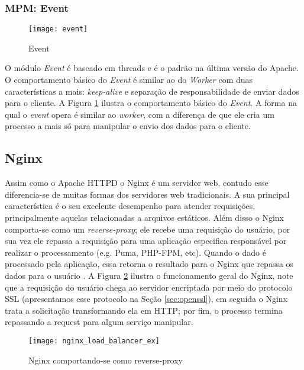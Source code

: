 \subsubsection{MPM: Event}

\begin{figure}[!h]
  \centering
  \texttt{[image: event]} 
  \caption{Event}
  \label{fig:event} 
\end{figure}

O módulo \textit{Event} é baseado em threads e é o padrão na última versão do
Apache. O comportamento básico do \textit{Event} é similar ao do
\textit{Worker} com duas características a mais: \textit{keep-alive} e
separação de responsabilidade de enviar dados para o cliente. A Figura
\ref{fig:event} ilustra o comportamento básico do \textit{Event}. A forma na
qual o \textit{event} opera é similar ao \textit{worker}, com a diferença de
que ele cria um processo a mais só para manipular o envio dos dados para o
cliente. 

\subsection{Nginx}

Assim como o Apache HTTPD o Nginx é um servidor web, contudo esse diferencia-se
de muitas formas dos servidores web tradicionais. A sua principal
característica é o seu excelente desempenho para atender requisições,
principalmente aquelas relacionadas a arquivos estáticos. Além disso o Nginx
comporta-se como um \textit{reverse-proxy}; ele recebe uma requisição do
usuário, por sua vez ele repassa a requisição para uma aplicação especifica
responsável por realizar o processamento (e.g. Puma, PHP-FPM, etc). Quando o
dado é processado pela aplicação, essa retorna o resultado para o Nginx que
repassa os dados para o usuário \citep{soni}. A Figura \ref{fig:nginx_basico}
ilustra o funcionamento geral do Nginx, note que a requisição do usuário chega
ao servidor encriptada por meio do protocolo SSL (apresentamos esse protocolo
na Seção \ref{sec:openssl}), em seguida o Nginx trata a solicitação
transformando ela em HTTP; por fim, o processo termina repassando a request
para algum serviço manipular.

\begin{figure}[!h]
  \centering
  \texttt{[image: nginx\_load\_balancer\_ex]} 
  \caption{Nginx comportando-se como reverse-proxy \citep{soni}}
  \label{fig:nginx_basico} 
\end{figure}

